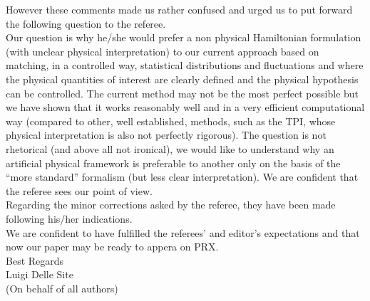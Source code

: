 \documentclass[12pt]{article}
\newcommand{\bluec}[1]{{\color{blue} #1}}
\begin{document}
However these comments made us rather confused and urged us to put forward the following question to the referee.\\
Our question is why he/she would prefer a non physical Hamiltonian formulation (with unclear physical interpretation) to our current approach based on matching, in a controlled way, statistical distributions and fluctuations and where the physical quantities of interest are clearly defined and the physical hypothesis can be controlled. The current method may not be the most perfect possible but we have shown that it works reasonably well and in a very efficient computational way (compared to other, well established, methods, such as the \bluec{TPI}, whose physical interpretation is also not perfectly rigorous). The question is not rhetorical (and above all not ironical), we would like to understand why an artificial physical framework is preferable to another only on the basis of the ``more standard'' formalism (but less clear interpretation). We are confident that the referee sees our point of view.\\


Regarding the minor corrections asked by the referee, they have been made following his/her indications.\\

We are confident to have fulfilled the referees' and editor's expectations and that now our paper may be ready to appera on PRX.\\


Best Regards\\



Luigi Delle Site\\
(On behalf of all authors)\\
\end{document}

